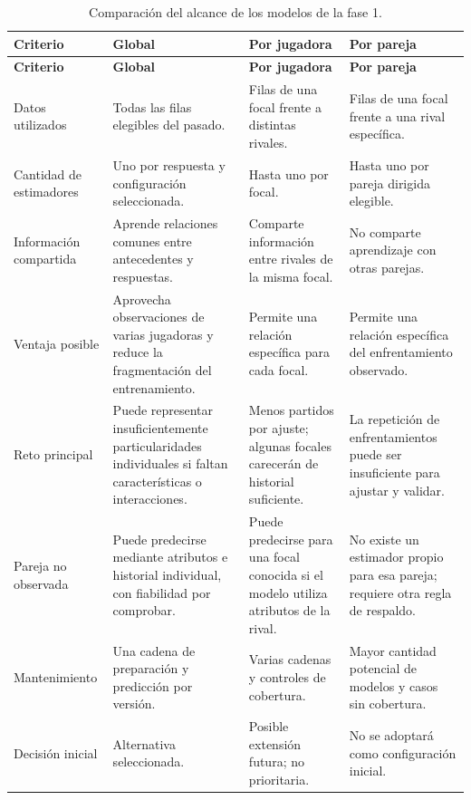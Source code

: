\begingroup
\small
\setlength{\tabcolsep}{3pt}
\renewcommand{\arraystretch}{1.15}
\begin{longtable}{@{}>{\raggedright\arraybackslash}p{2.3cm}>{\raggedright\arraybackslash}p{3.55cm}>{\raggedright\arraybackslash}p{3.55cm}>{\raggedright\arraybackslash}p{3.55cm}@{}}
\caption{Comparación del alcance de los modelos de la fase 1.}
\label{tab:alcance-modelos-616}\\
\toprule
\textbf{Criterio} & \textbf{Global} & \textbf{Por jugadora} & \textbf{Por pareja}\\
\midrule
\endfirsthead
\toprule
\textbf{Criterio} & \textbf{Global} & \textbf{Por jugadora} & \textbf{Por pareja}\\
\midrule
\endhead
\bottomrule
\endfoot
Datos utilizados & Todas las filas elegibles del pasado. & Filas de una focal frente a distintas rivales. & Filas de una focal frente a una rival específica.\\
Cantidad de estimadores & Uno por respuesta y configuración seleccionada. & Hasta uno por focal. & Hasta uno por pareja dirigida elegible.\\
Información compartida & Aprende relaciones comunes entre antecedentes y respuestas. & Comparte información entre rivales de la misma focal. & No comparte aprendizaje con otras parejas.\\
Ventaja posible & Aprovecha observaciones de varias jugadoras y reduce la fragmentación del entrenamiento. & Permite una relación específica para cada focal. & Permite una relación específica del enfrentamiento observado.\\
Reto principal & Puede representar insuficientemente particularidades individuales si faltan características o interacciones. & Menos partidos por ajuste; algunas focales carecerán de historial suficiente. & La repetición de enfrentamientos puede ser insuficiente para ajustar y validar.\\
Pareja no observada & Puede predecirse mediante atributos e historial individual, con fiabilidad por comprobar. & Puede predecirse para una focal conocida si el modelo utiliza atributos de la rival. & No existe un estimador propio para esa pareja; requiere otra regla de respaldo.\\
Manteni\-miento & Una cadena de preparación y predicción por versión. & Varias cadenas y controles de cobertura. & Mayor cantidad potencial de modelos y casos sin cobertura.\\
Decisión inicial & Alternativa seleccionada. & Posible extensión futura; no prioritaria. & No se adoptará como configuración inicial.\\
\end{longtable}
\endgroup

